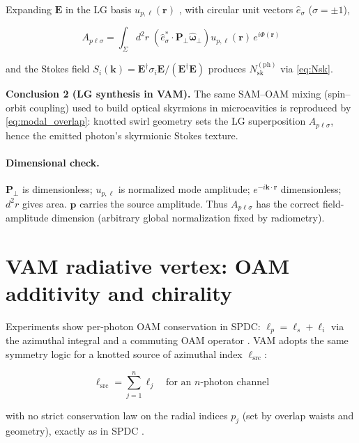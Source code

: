 \documentclass[12pt]{article}
\begin{document}
Expanding $\mathbf{E}$ in the LG basis $u_{p,\ell}(\mathbf{r})$ \cite{Allen1992OAM}, with circular unit vectors $\hat{e}_\sigma$ ($\sigma=\pm 1$),

\begin{equation}
A_{p\ell\sigma} = \int_{\Sigma} d^{2}r \;
\left( \hat{e}_\sigma^* \cdot \mathbf{P}_\perp \hat{\boldsymbol{\omega}}_\perp \right)
u_{p,\ell}(\mathbf{r}) \, e^{i\Phi(\mathbf{r})}
\label{eq:modal_overlap}
\end{equation}

and the Stokes field $S_i(\mathbf{k})=\mathbf{E}^\dagger\sigma_i\mathbf{E}/(\mathbf{E}^\dagger\mathbf{E})$ produces $N_{\mathrm{sk}}^{(\mathrm{ph})}$ via \eqref{eq:Nsk}.

\textbf{Conclusion 2 (LG synthesis in VAM).} The same SAM--OAM mixing (spin--orbit coupling) used to build optical skyrmions in microcavities \cite{Ma2025NanoPhotonSkyrmions,Shen2024NatPhoton} is reproduced by \eqref{eq:modal_overlap}: knotted swirl geometry sets the LG superposition ${A_{p\ell\sigma}}$, hence the emitted photon’s skyrmionic Stokes texture.

\paragraph{Dimensional check.} $\mathbf{P}_\perp$ is dimensionless; $u_{p,\ell}$ is normalized mode amplitude; $e^{-i\mathbf{k}\cdot\mathbf{r}}$ dimensionless; $d^2 r$ gives area. $\mathbf{p}$ carries the source amplitude. Thus $A_{p\ell\sigma}$ has the correct field-amplitude dimension (arbitrary global normalization fixed by radiometry).

\section{VAM radiative vertex: OAM additivity and chirality}

Experiments show per-photon OAM conservation in SPDC: $\ell_p=\ell_s+\ell_i$ via the azimuthal integral and a commuting OAM operator \cite{Kopf2025OAMConservation,Walborn2010SPDCReview}. VAM adopts the same symmetry logic for a knotted source of azimuthal index $\ell_\textrm{src}$:

\begin{equation}
\boxed{\ell_\textrm{src} = \sum_{j=1}^{n} \ell_j \quad \text{for an $n$-photon channel}}
\label{eq:oam_additivity}
\end{equation}

with no strict conservation law on the radial indices $p_j$ (set by overlap waists and geometry), exactly as in SPDC \cite{Walborn2010SPDCReview}.
\end{document}
